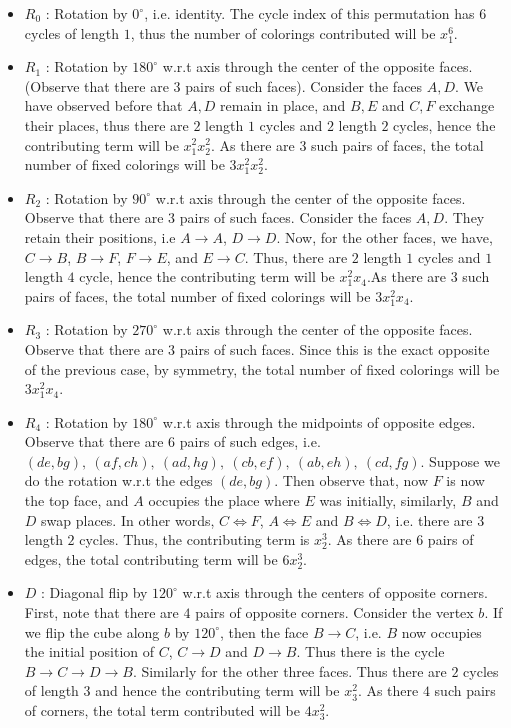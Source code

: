 \begin{itemize}
\item $R_0$ : Rotation by $0^{\circ}$, i.e. identity. The cycle index of this permutation has $6$ cycles of length $1$, thus the number of colorings contributed will be $\boxed{x_1^6}$.

\item $R_1$ : Rotation by $180^{\circ}$ w.r.t axis through the center of the opposite faces. (Observe that there are $3$ pairs of such faces). Consider the faces $A, D$. We have observed before that $A, D$ remain in place, and $B, E$ and $C, F$ exchange their places, thus there are $2$ length $1$ cycles and $2$ length $2$ cycles, hence the contributing term will be $x_1^2x_2^2$. As there are $3$ such pairs of faces, the total number of fixed colorings will be $\boxed{3x_1^2x_2^2}$.

\item $R_2$ : Rotation by $90^{\circ}$ w.r.t axis through the center of the opposite faces. Observe that there are $3$ pairs of such faces. Consider the faces $A, D$. They retain their positions, i.e $A \rightarrow A$, $D \rightarrow D$. Now, for the other faces, we have, $C \rightarrow B$, $B \rightarrow F$, $F \rightarrow E$, and $E \rightarrow C$. Thus, there are $2$ length $1$ cycles and $1$ length $4$ cycle, hence the contributing term will be $x_1^2x_4$.As there are $3$ such pairs of faces, the total number of fixed colorings will be $\boxed{3x_1^2x_4}$.

\item $R_3$ : Rotation by $270^{\circ}$ w.r.t axis through the center of the opposite faces. Observe that there are $3$ pairs of such faces. Since this is the exact opposite of the previous case, by symmetry, the total number of fixed colorings will be $\boxed{3x_1^2x_4}$.

\item $R_4$ : Rotation by $180^{\circ}$ w.r.t axis through the midpoints of opposite edges. Observe that there are $6$ pairs of such edges, i.e. $(de, bg),\ (af, ch),\ (ad, hg),\ (cb, ef),\ (ab, eh),\ (cd, fg)$. Suppose we do the rotation w.r.t the edges $(de, bg)$. Then observe that, now $F$ is now the top face, and $A$ occupies the place where $E$ was initially, similarly, $B$ and $D$ swap places. In other words, $C \iff F$, $A \iff E$ and $B \iff D$, i.e. there are $3$ length $2$ cycles. Thus, the contributing term is $x_2^3$. As there are $6$ pairs of edges, the total contributing term will be $\boxed{6 x_2^3}$.

\item $D$ : Diagonal flip by $120^{\circ}$ w.r.t axis through the centers of opposite corners. First, note that there are $4$ pairs of opposite corners. 
Consider the vertex $b$. If we flip the cube along $b$ by $120^{\circ}$, then the face $B \rightarrow C$, i.e. $B$ now occupies the initial position of $C$, $C \rightarrow D$ and $D \rightarrow B$. Thus there is the cycle $B \rightarrow C \rightarrow D \rightarrow B$. Similarly for the other three faces. Thus there are $2$ cycles of length $3$ and hence the contributing term will be $x_3^2$. As there $4$ such pairs of corners, the total term contributed will be $\boxed{4x_3^2}$.


\end{itemize}
